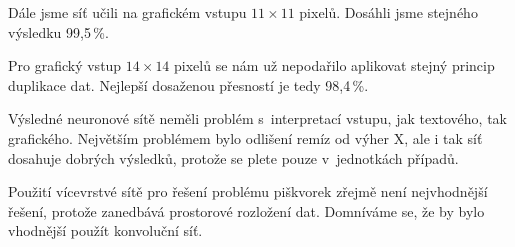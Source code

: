 \documentclass[10pt,a4paper]{article}
\begin{document}
Dále jsme síť učili na grafickém vstupu $11\times 11$ pixelů. 
Dosáhli jsme stejného výsledku 99,5\,\%.

Pro grafický vstup $14\times 14$ pixelů se nám už nepodařilo aplikovat stejný princip duplikace dat. Nejlepší dosaženou přesností je tedy 98,4\,\%.

Výsledné neuronové sítě neměli problém s~interpretací vstupu, jak textového, tak grafického. Největším problémem bylo odlišení remíz od výher X, ale i tak síť dosahuje dobrých výsledků, protože se plete pouze v~jednotkách případů. 

Použití vícevrstvé sítě pro řešení problému piškvorek zřejmě není nejvhodnější řešení, protože zanedbává prostorové rozložení dat. Domníváme se, že by bylo vhodnější použít konvoluční síť.
\end{document}
